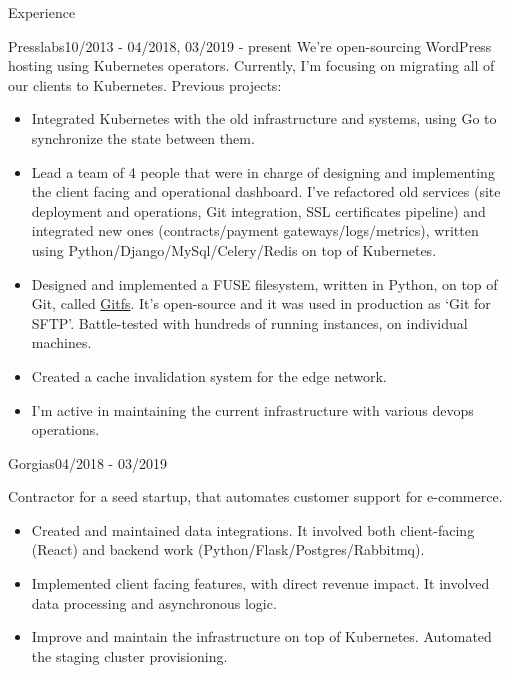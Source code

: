 \documentclass{resume}
\begin{document}
\begin{rSection}{Experience}

    \begin{rSubsection}{Presslabs}{10/2013 - 04/2018, 03/2019 - present}{}{}
      We’re open-sourcing WordPress hosting using Kubernetes operators. Currently, I'm focusing on migrating all of our clients to Kubernetes. Previous projects:
        \begin{itemize}
            \setlength\itemsep{-0.3em}
            \item Integrated Kubernetes with the old infrastructure and systems, using Go to synchronize the state between them.
            \item Lead a team of 4 people that were in charge of designing and implementing the client facing and operational dashboard. I’ve refactored old services (site deployment and operations, Git integration, SSL certificates pipeline) and integrated new ones (contracts/payment gateways/logs/metrics), written using Python/Django/MySql/Celery/Redis on top of Kubernetes.
            \item Designed and implemented a FUSE filesystem, written in Python, on top of Git, called \href{https://github.com/presslabs/gitfs.git}{Gitfs}. It’s open-source and it was used in production as ‘Git for SFTP’. Battle-tested with hundreds of running instances, on individual machines.
            \item Created a cache invalidation system for the edge network.
            \item I’m active in maintaining the current infrastructure with various devops operations.
        \end{itemize}
    \end{rSubsection}

    \begin{rSubsection}{Gorgias}{04/2018 - 03/2019}{}{}
        \item Contractor for a seed startup, that automates customer support for e-commerce.
        \begin{itemize}
            \setlength\itemsep{-0.3em}
            \item Created and maintained data integrations. It involved both client-facing (React) and backend work (Python/Flask/Postgres/Rabbitmq).
            \item Implemented client facing features, with direct revenue impact. It involved data processing and asynchronous logic.
            \item Improve and maintain the infrastructure on top of Kubernetes. Automated the staging cluster provisioning.
        \end{itemize}
    \end{rSubsection}


\end{rSection}
\end{document}
